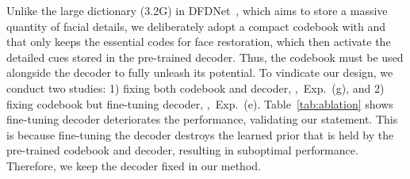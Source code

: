 Unlike the large dictionary (3.2G) in DFDNet~\cite{li2020blind}, which aims to store a massive quantity of facial details, we deliberately adopt a compact codebook  with  and  that only keeps the essential codes for face restoration, which then activate the detailed cues stored in the pre-trained decoder. Thus, the codebook must be used alongside the decoder to fully unleash its potential. To vindicate our design,  we conduct two studies: 1) fixing both codebook and decoder, \ie,~Exp.~(g), and 2) fixing codebook but fine-tuning decoder, \ie,~Exp.~(e). 
Table~\ref{tab:ablation} shows fine-tuning decoder deteriorates the performance, validating our statement. This is because fine-tuning the decoder destroys the learned prior that is held by the pre-trained codebook and decoder, resulting in suboptimal performance. Therefore, we keep the decoder fixed in our method. 
